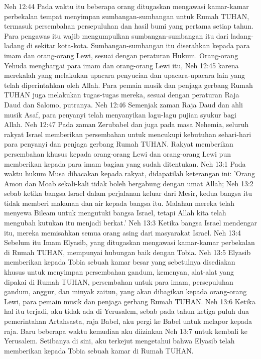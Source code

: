 Neh 12:44  Pada waktu itu beberapa orang ditugaskan mengawasi kamar-kamar perbekalan tempat menyimpan sumbangan-sumbangan untuk Rumah TUHAN, termasuk persembahan persepuluhan dan hasil bumi yang pertama setiap tahun. Para pengawas itu wajib mengumpulkan sumbangan-sumbangan itu dari ladang-ladang di sekitar kota-kota. Sumbangan-sumbangan itu diserahkan kepada para imam dan orang-orang Lewi, sesuai dengan peraturan Hukum. Orang-orang Yehuda menghargai para imam dan orang-orang Lewi itu,
Neh 12:45  karena merekalah yang melakukan upacara penyucian dan upacara-upacara lain yang telah diperintahkan oleh Allah. Para pemain musik dan penjaga gerbang Rumah TUHAN juga melakukan tugas-tugas mereka, sesuai dengan peraturan Raja Daud dan Salomo, putranya.
Neh 12:46  Semenjak zaman Raja Daud dan ahli musik Asaf, para penyanyi telah menyanyikan lagu-lagu pujian syukur bagi Allah.
Neh 12:47  Pada zaman Zerubabel dan juga pada masa Nehemia, seluruh rakyat Israel memberikan persembahan untuk mencukupi kebutuhan sehari-hari para penyanyi dan penjaga gerbang Rumah TUHAN. Rakyat memberikan persembahan khusus kepada orang-orang Lewi dan orang-orang Lewi pun memberikan kepada para imam bagian yang sudah ditentukan.
Neh 13:1  Pada waktu hukum Musa dibacakan kepada rakyat, didapatilah keterangan ini: 'Orang Amon dan Moab sekali-kali tidak boleh bergabung dengan umat Allah;
Neh 13:2  sebab ketika bangsa Israel dalam perjalanan keluar dari Mesir, kedua bangsa itu tidak memberi makanan dan air kepada bangsa itu. Malahan mereka telah menyewa Bileam untuk mengutuki bangsa Israel, tetapi Allah kita telah mengubah kutukan itu menjadi berkat.'
Neh 13:3  Ketika bangsa Israel mendengar itu, mereka memisahkan semua orang asing dari masyarakat Israel.
Neh 13:4  Sebelum itu Imam Elyasib, yang ditugaskan mengawasi kamar-kamar perbekalan di Rumah TUHAN, mempunyai hubungan baik dengan Tobia.
Neh 13:5  Elyasib memberikan kepada Tobia sebuah kamar besar yang sebetulnya disediakan khusus untuk menyimpan persembahan gandum, kemenyan, alat-alat yang dipakai di Rumah TUHAN, persembahan untuk para imam, persepuluhan gandum, anggur, dan minyak zaitun, yang akan dibagikan kepada orang-orang Lewi, para pemain musik dan penjaga gerbang Rumah TUHAN.
Neh 13:6  Ketika hal itu terjadi, aku tidak ada di Yerusalem, sebab pada tahun ketiga puluh dua pemerintahan Artahsasta, raja Babel, aku pergi ke Babel untuk melapor kepada raja. Baru beberapa waktu kemudian aku diizinkan
Neh 13:7  untuk kembali ke Yerusalem. Setibanya di sini, aku terkejut mengetahui bahwa Elyasib telah memberikan kepada Tobia sebuah kamar di Rumah TUHAN.
